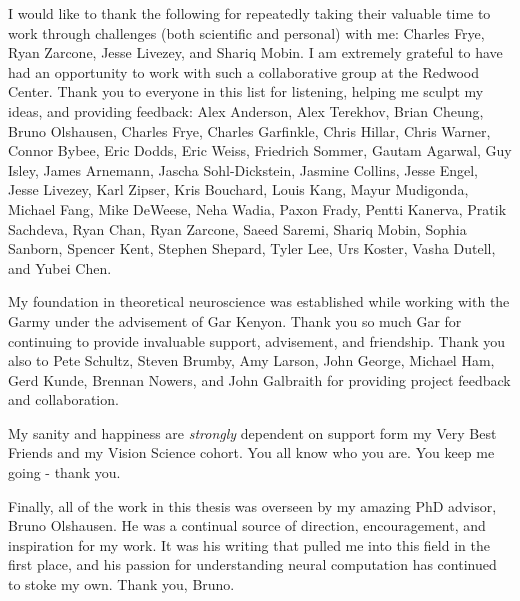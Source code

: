 \documentclass{ucbthesis}
\begin{document}
\begin{frontmatter}
\begin{acknowledgements}
I would like to thank the following for repeatedly taking their valuable time to work through challenges (both scientific and personal) with me: Charles Frye, Ryan Zarcone, Jesse Livezey, and Shariq Mobin. I am extremely grateful to have had an opportunity to work with such a collaborative group at the Redwood Center. Thank you to everyone in this list for listening, helping me sculpt my ideas, and providing feedback: Alex Anderson, Alex Terekhov, Brian Cheung, Bruno Olshausen, Charles Frye, Charles Garfinkle, Chris Hillar, Chris Warner, Connor Bybee, Eric Dodds, Eric Weiss, Friedrich Sommer, Gautam Agarwal, Guy Isley, James Arnemann, Jascha Sohl-Dickstein, Jasmine Collins, Jesse Engel, Jesse Livezey, Karl Zipser, Kris Bouchard, Louis Kang, Mayur Mudigonda, Michael Fang, Mike DeWeese, Neha Wadia, Paxon Frady, Pentti Kanerva, Pratik Sachdeva, Ryan Chan, Ryan Zarcone, Saeed Saremi, Shariq Mobin, Sophia Sanborn, Spencer Kent, Stephen Shepard, Tyler Lee, Urs Koster, Vasha Dutell, and Yubei Chen.

My foundation in theoretical neuroscience was established while working with the Garmy under the advisement of Gar Kenyon. Thank you so much Gar for continuing to provide invaluable support, advisement, and friendship. Thank you also to Pete Schultz, Steven Brumby, Amy Larson, John George, Michael Ham, Gerd Kunde, Brennan Nowers, and John Galbraith for providing project feedback and collaboration.

My sanity and happiness are \textit{strongly} dependent on support form my Very Best Friends and my Vision Science cohort. You all know who you are. You keep me going - thank you.

Finally, all of the work in this thesis was overseen by my amazing PhD advisor, Bruno Olshausen. He was a continual source of direction, encouragement, and inspiration for my work. It was his writing that pulled me into this field in the first place, and his passion for understanding neural computation has continued to stoke my own. Thank you, Bruno.
\end{acknowledgements}

\end{frontmatter}

\pagestyle{headings}


\label{ch:intro}
\label{ch:lca}
\label{ch:hierarchical_sc}
\label{ch:iso}
\label{ch:conclusion}


\clearpage
\printbibliography
\end{document}
